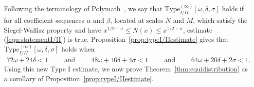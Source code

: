 \documentclass{amsart}
\numberwithin{equation}{section}
\begin{document}
\vspace{3mm}
 Following the terminology of Polymath~\cite{Polymath:2014:EDZ}, we say that $\mbox{Type}_{I/II}^{(\infty)}[\omega,\delta,\sigma]$ holds if for all coefficient sequences $\alpha$ and $\beta$, located at scales $N$ and $M$, which satisfy the Siegel-Walfisz property and have $x^{1/2-\sigma} \leq N(x) \leq x^{1/2+\sigma}$, estimate (\ref{equ:statementI/II}) is true.  
  Proposition~\ref{prop:typeI/IIestimate} gives that $\mbox{Type}_{I/II}^{(\infty)}[\omega,\delta,\sigma]$ holds when 
\begin{align*}
72\omega + 24\delta <1 \qquad \mbox{ and } \qquad 
48 \omega +16\delta+4\sigma   < 1 \qquad \mbox{ and } \qquad 64\omega + 20\delta+2\sigma   <1.
\end{align*}
Using this new Type I estimate, we now prove Theorem~\ref{thm:equidistribution} as a corollary of Proposition~\ref{prop:typeI/IIestimate}.
\end{document}
